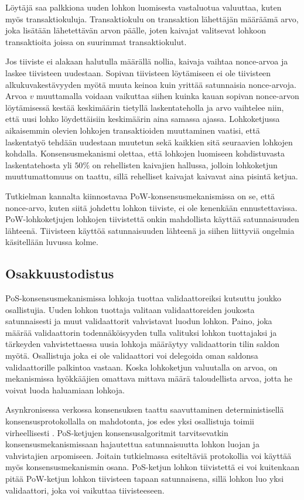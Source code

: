 Löytäjä saa palkkiona uuden lohkon luomisesta vastaluotua valuuttaa, kuten myös transaktiokuluja. Transaktiokulu on transaktion lähettäjän määräämä arvo, joka lisätään lähetettävän arvon päälle, joten kaivajat valitsevat lohkoon transaktioita joissa on suurimmat transaktiokulut.

Jos tiiviste ei alakaan halutulla määrällä nollia, kaivaja vaihtaa nonce-arvoa ja laskee tiivisteen uudestaan. Sopivan tiivisteen löytämiseen ei ole tiivisteen alkukuvakestävyyden myötä muuta keinoa kuin yrittää satunnaisia nonce-arvoja. Arvoa $v$ muuttamalla voidaan vaikuttaa siihen kuinka kauan sopivan nonce-arvon löytämisessä kestää keskimäärin tietyllä laskentateholla ja arvo vaihtelee niin, että uusi lohko löydettäisiin keskimäärin aina samassa ajassa. Lohkoketjussa aikaisemmin olevien lohkojen transaktioiden muuttaminen vaatisi, että laskentatyö tehdään uudestaan muutetun sekä kaikkien sitä seuraavien lohkojen kohdalla. Konsensusmekanismi olettaa, että lohkojen luomiseen kohdistuvasta laskentatehosta yli $50\%$ on rehellisten kaivajien hallussa, jolloin lohkoketjun muuttumattomuus on taattu, sillä rehelliset kaivajat kaivavat aina pisintä ketjua.

Tutkielman kannalta kiinnostavaa PoW-konsensusmekanismissa on se, että nonce-arvo, kuten siitä johdettu lohkon tiiviste, ei ole kenenkään ennustettavissa. PoW-lohkoketjujen lohkojen tiivistettä onkin mahdollista käyttää satunnaisuuden lähteenä. Tiivisteen käyttöä satunnaisuuden lähteenä ja siihen liittyviä ongelmia käsitellään luvussa kolme.

\subsection{Osakkuustodistus}

PoS-konsensusmekanismissa lohkoja tuottaa validaattoreiksi kutsuttu joukko osallistujia. Uuden lohkon tuottaja valitaan validaattoreiden joukosta satunnaisesti ja muut validaattorit vahvistavat luodun lohkon. Paino, joka määrää validaattorin todennäköisyyden tulla valituksi lohkon tuottajaksi ja tärkeyden vahvistettaessa uusia lohkoja määräytyy validaattorin tilin saldon myötä. Osallistuja joka ei ole validaattori voi delegoida oman saldonsa validaattorille palkintoa vastaan. Koska lohkoketjun valuutalla on arvoa, on mekanismissa hyökkääjien omattava mittava määrä taloudellista arvoa, jotta he voivat luoda haluamiaan lohkoja.

Asynkronisessa verkossa konsensuksen taattu saavuttaminen deterministisellä konsensusprotokollalla on mahdotonta, jos edes yksi osallistuja toimii virheellisesti \cite{fischer_impossibility_1985}. PoS-ketjujen konsensusalgoritmit tarvitsevatkin konsensusmekanismissaan hajautettua satunnaisuutta lohkon luojan ja vahvistajien arpomiseen. Joitain tutkielmassa esiteltäviä protokollia voi käyttää myös konsensusmekanismin osana. PoS-ketjun lohkon tiivistettä ei voi kuitenkaan pitää PoW-ketjun lohkon tiivisteen tapaan satunnaisena, sillä lohkon luo yksi validaattori, joka voi vaikuttaa tiivisteeseen.

